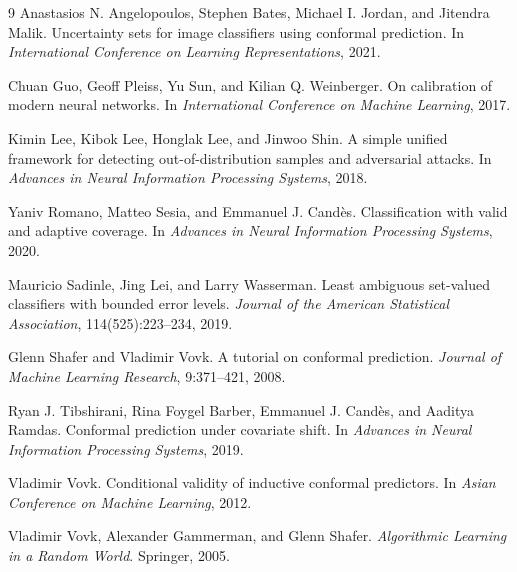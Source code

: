 \documentclass{article}
\begin{document}
\begin{thebibliography}{9}
Anastasios N. Angelopoulos, Stephen Bates, Michael I. Jordan, and Jitendra Malik.
\newblock Uncertainty sets for image classifiers using conformal prediction.
\newblock In \emph{International Conference on Learning Representations}, 2021.

Chuan Guo, Geoff Pleiss, Yu Sun, and Kilian Q. Weinberger.
\newblock On calibration of modern neural networks.
\newblock In \emph{International Conference on Machine Learning}, 2017.

Kimin Lee, Kibok Lee, Honglak Lee, and Jinwoo Shin.
\newblock A simple unified framework for detecting out-of-distribution samples and adversarial
attacks.
\newblock In \emph{Advances in Neural Information Processing Systems}, 2018.

Yaniv Romano, Matteo Sesia, and Emmanuel J. Cand\`es.
\newblock Classification with valid and adaptive coverage.
\newblock In \emph{Advances in Neural Information Processing Systems}, 2020.

Mauricio Sadinle, Jing Lei, and Larry Wasserman.
\newblock Least ambiguous set-valued classifiers with bounded error levels.
\newblock \emph{Journal of the American Statistical Association}, 114(525):223--234, 2019.

Glenn Shafer and Vladimir Vovk.
\newblock A tutorial on conformal prediction.
\newblock \emph{Journal of Machine Learning Research}, 9:371--421, 2008.

Ryan J. Tibshirani, Rina Foygel Barber, Emmanuel J. Cand\`es, and Aaditya Ramdas.
\newblock Conformal prediction under covariate shift.
\newblock In \emph{Advances in Neural Information Processing Systems}, 2019.

Vladimir Vovk.
\newblock Conditional validity of inductive conformal predictors.
\newblock In \emph{Asian Conference on Machine Learning}, 2012.

Vladimir Vovk, Alexander Gammerman, and Glenn Shafer.
\newblock \emph{Algorithmic Learning in a Random World}.
\newblock Springer, 2005.
\end{thebibliography}
\end{document}
